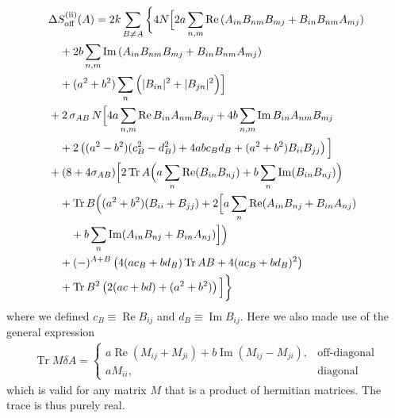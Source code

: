 \documentclass[10pt,a4paper]{article}
\newcommand{\RN}[1]{%
    \textup{\uppercase\expandafter{\romannumeral#1}}%
}
\DeclareMathOperator{\Tr}{Tr}
\newcommand{\deltaA}{\delta \! A}
\begin{document}
\begin{align}
  &\Delta S^{(\RN{2})}_{\text{off}} (A) =
  2k \sum_{B \neq A} \bigg\{ 4N \Big[
      2a \sum_{n,m} \operatorname{Re}
      \left( A_{in} B_{nm} B_{mj} + B_{in} B_{nm} A_{mj} \right)\\
      &\quad+ 2b \sum_{n,m} \operatorname{Im}
      \left( A_{in} B_{nm} B_{mj} + B_{in} B_{nm} A_{mj} \right)\\
      &\quad+ (a^2 + b^2) \sum_n \Big( |B_{in}|^2 + |B_{jn}|^2 \Big)
  \Big]\\
  &+ 2 \,  \sigma_{AB} \, N   \Big[
    4a \sum_{n,m} \operatorname{Re} B_{in} A_{nm} B_{mj}
    +4b \sum_{n,m} \operatorname{Im} B_{in} A_{nm} B_{mj} \\
    &\quad+
    2 \left(
      (a^2-b^2)(c_B^2-d_B^2) + 4abc_B d_B + (a^2+b^2) B_{ii} B_{jj}
    \right)
  \Big]\\
  &+ (8+4\sigma_{AB}) \Big[
    2 \Tr A \Big(
      a \sum_n \operatorname{Re} (B_{in} B_{nj})
      +b \sum_n \operatorname{Im} (B_{in} B_{nj})
          \Big) \\
    &\quad+ \Tr B \Big(
      (a^2+b^2)(B_{ii}+B_{jj}) + 2 \Big[
        a \sum_n \operatorname{Re} (A_{in} B_{nj} + B_{in} A_{nj}) \\
        &\quad\quad+b \sum_n \operatorname{Im} (A_{in} B_{nj} + B_{in} A_{nj})
      \Big] \Big) \\
      &\quad+ (-)^{A+B} \left(
       4 (ac_B+bd_B) \Tr AB + 4(ac_B+bd_B)^2
     \right) \\
   &\quad+ \Tr B^2 \left( 2(ac+bd)+(a^2+b^2) \right)
  \Big]
 \bigg\}
\end{align}
where we defined $c_B \equiv \operatorname{Re} B_{ij}$ and
$d_B \equiv \operatorname{Im} B_{ij}$.
Here we also made use of the general expression
\begin{align}
  \Tr M \deltaA =
  \begin{cases}
    a \operatorname{Re} (M_{ij} + M_{ji})
    +b \operatorname{Im} (M_{ij} - M_{ji}), &\text{off-diagonal}\\
    a M_{ii}, &\text{diagonal}
  \end{cases}
\end{align}
which is valid for any matrix $M$ that is a product of hermitian matrices.
The trace is thus purely real.
\end{document}
